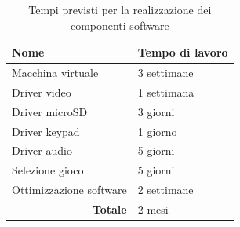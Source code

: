 \documentclass[a4paper]{article}
\begin{document}
\begin{center}
	\begin{table}[h]
		\centering
		\begin{tabular}{|l|l|}
			\hline
			\textbf{Nome}                         & \textbf{Tempo di lavoro} \\ \hline
			Macchina virtuale                     & 3 settimane              \\ \hline
			Driver video                          & 1 settimana              \\ \hline
			Driver microSD                        & 3 giorni                 \\ \hline
			Driver keypad                         & 1 giorno                 \\ \hline
			Driver audio                          & 5 giorni                 \\ \hline
			Selezione gioco                       & 5 giorni                 \\ \hline
			Ottimizzazione software               & 2 settimane              \\ \hline
			\multicolumn{1}{|r|}{\textbf{Totale}} & 2 mesi                   \\ \hline
		\end{tabular}
		\caption{
			Tempi previsti per la realizzazione dei componenti software
		}
	\end{table}

\end{center}
\end{document}
